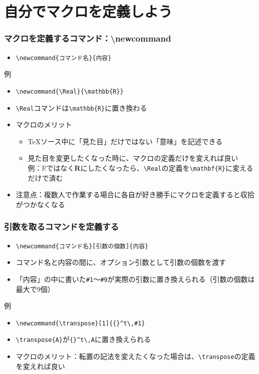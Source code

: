 \documentclass[aspectratio=169]{beamer}
\newcommand\cmdname[1]{\texttt{\textbackslash #1}}
\begin{document}
\section{自分でマクロを定義しよう}
\begin{frame}[fragile]\frametitle{マクロを定義するコマンド：\textbackslash newcommand}
  \begin{itemize}
  \item \lstinline!\newcommand{コマンド名}{内容}!
  \end{itemize}
  \begin{exampleblock}{例}
    \begin{itemize}
    \item \lstinline!\newcommand{\Real}{\mathbb{R}}!
    \item \cmdname{Real}コマンドは\lstinline!\mathbb{R}!に置き換わる
    \item マクロのメリット
      \begin{itemize}
      \item \TeX ソース中に「見た目」だけではない「意味」を記述できる
      \item 見た目を変更したくなった時に、マクロの定義だけを変えれば良い \\
        例：$\mathbb{R}$ではなく$\mathbf{R}$にしたくなったら、\cmdname{Real}の定義を\lstinline!\mathbf{R}!に変えるだけで済む
      \end{itemize}
    \item 注意点：複数人で作業する場合に各自が好き勝手にマクロを定義すると収拾がつかなくなる
    \end{itemize}
  \end{exampleblock}
\end{frame}
\begin{frame}[fragile]\frametitle{引数を取るコマンドを定義する}
  \begin{itemize}
  \item \lstinline!\newcommand{コマンド名}[引数の個数]{内容}!
  \item コマンド名と内容の間に、オプション引数として引数の個数を渡す
  \item 「内容」の中に書いた\texttt{\#1}〜\texttt{\#9}が実際の引数に置き換えられる（引数の個数は最大で9個）
  \end{itemize}
  \begin{exampleblock}{例}
    \begin{itemize}
    \item \lstinline!\newcommand{\transpose}[1]{{}^t\,#1}!
    \item \lstinline!\transpose{A}!が\lstinline!{}^t\,A!に置き換えられる
    \item マクロのメリット：転置の記法を変えたくなった場合は、\cmdname{transpose}の定義を変えれば良い
    \end{itemize}
  \end{exampleblock}
\end{frame}
\end{document}

